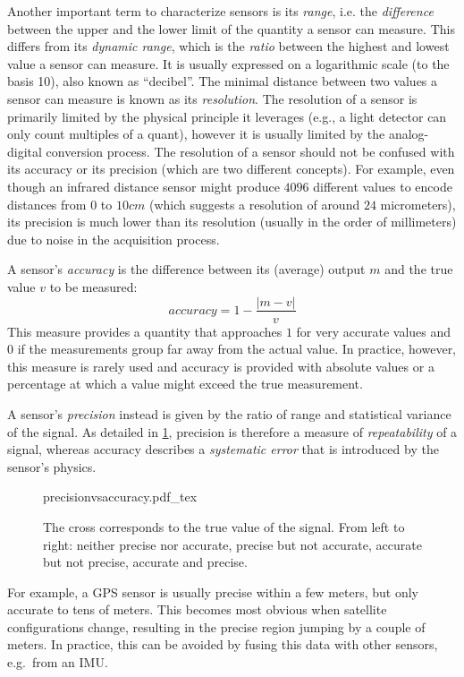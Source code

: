 Another important term to characterize sensors is its \textsl{range}, i.e. the \textsl{difference} between the upper and the lower limit of the quantity a sensor can measure.
This differs from its \textsl{dynamic range}, which is the \textsl{ratio} between the highest and lowest value a sensor can measure. It is usually expressed on a logarithmic scale (to the basis 10), also known as ``decibel''. The minimal distance between two values a sensor can measure is known as its  \textsl{resolution}. The resolution of a sensor is primarily limited by the physical principle it leverages (e.g., a light detector can only count multiples of a quant), however it is usually limited by the analog-digital conversion process.
The resolution of a sensor should not be confused with its accuracy or its precision (which are two different concepts). For example, even though an infrared distance sensor might produce $4096$ different values to encode distances from $0$ to $10cm$ (which suggests a resolution of around $24$ micrometers), its precision is much lower than its resolution (usually in the order of millimeters) due to noise in the acquisition process.

A sensor's \textsl{accuracy} is the difference between its (average) output $m$ and the true value $v$ to be measured:
\begin{equation}
accuracy=1-\frac{|m-v|}{v}
\end{equation}
This measure provides a quantity that approaches $1$ for very accurate values and $0$ if the measurements group far away from the actual value. In practice, however, this measure is rarely used and accuracy is provided with absolute values or a percentage at which a value might exceed the true measurement.

A sensor's \textsl{precision} instead is given by the ratio of range and statistical variance of the signal.
As detailed in \cref{fig:precision}, precision is therefore a measure of \textsl{repeatability} of a signal, whereas accuracy describes a \textsl{systematic error} that is introduced by the sensor's physics.
\begin{figure}
	\centering
	\def\svgwidth{0.9\textwidth}
    {precisionvsaccuracy.pdf_tex}
	\caption{The cross corresponds to the true value of the signal. From left to right: neither precise nor accurate, precise but not accurate, accurate but not precise, accurate and precise.
	\label{fig:precision}}
\end{figure}
%
For example, a GPS sensor is usually precise within a few meters, but only accurate to tens of meters. This becomes most obvious when satellite configurations change, resulting in the precise region jumping by a couple of meters. In practice, this can be avoided by fusing this data with other sensors, e.g.\ from an IMU.

